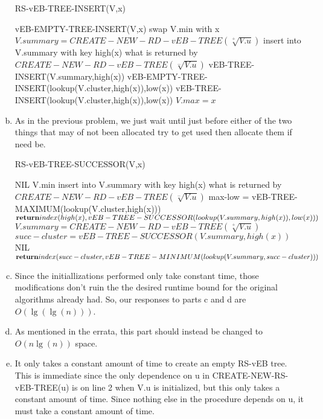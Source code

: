 \documentclass{article}
\begin{document}
\begin{enumerate}[a.]
\begin{algorithm}
\caption{RS-vEB-TREE-INSERT(V,x)}
\begin{algorithmic}
\State vEB-EMPTY-TREE-INSERT(V,x)
\Else
	\State swap V.min with x
	\EndIf
	\State $V.summary = CREATE-NEW-RD-vEB-TREE(\sqrt[+]{V.u})$
	\EndIf
	\State insert into V.summary with key high(x) what is returned by $CREATE-NEW-RD-vEB-TREE(\sqrt[-]{V.u})$
	\EndIf
	\State vEB-TREE-INSERT(V.summary,high(x))
	\State vEB-EMPTY-TREE-INSERT(lookup(V.cluster,high(x)),low(x))
	\Else
	\State vEB-TREE-INSERT(lookup(V.cluster,high(x)),low(x))
	\EndIf
	\EndIf
	\State $V.max = x$
	\EndIf
\EndIf
\end{algorithmic}
\end{algorithm}

\item

As in the previous problem, we just wait until just before either of the two things that may of not been allocated try to get used then allocate them if need be.
\begin{algorithm}
\caption{RS-vEB-TREE-SUCCESSOR(V,x)}
\begin{algorithmic}
\State {}
\Else
\State \Return NIL
\EndIf
{}
\State\Return V.min
\Else
{}
\State insert into V.summary with key high(x) what is returned by $CREATE-NEW-RD-vEB-TREE(\sqrt[-]{V.u})$
\EndIf
\State max-low = vEB-TREE-MAXIMUM(lookup(V.cluster,high(x)))
\State $\Return index(high(x),vEB-TREE-SUCCESSOR(lookup(V.summary,high(x)),low(x)))$
\Else
{}
\State $V.summary = CREATE-NEW-RD-vEB-TREE(\sqrt[+]{V.u})$
\EndIf
\State $succ-cluster = vEB-TREE-SUCCESSOR(V.summary,high(x))$
\State\Return NIL
\Else
\State $\Return index(succ-cluster,vEB-TREE-MINIMUM(lookup(V.summary,succ-cluster)))$
\EndIf
\EndIf
\EndIf
\end{algorithmic}
\end{algorithm}

\item
Since the initiallizations performed only take constant time, those modifications don't ruin the the desired runtime bound for the original algorithms already had. So, our responses to parts c and d are $O(\lg(\lg(n)))$.

\item
As mentioned in the errata, this part should instead be changed to $O(n\lg(n))$ space.


\item
It only takes a constant amount of time to create an empty RS-vEB tree. This is immediate since the only dependence on u in CREATE-NEW-RS-vEB-TREE(u) is on line 2 when V.u is initialized, but this only takes a constant amount of time. Since nothing else in the procedure depends on u, it must take a constant amount of time.
\end{enumerate}
\end{document}
